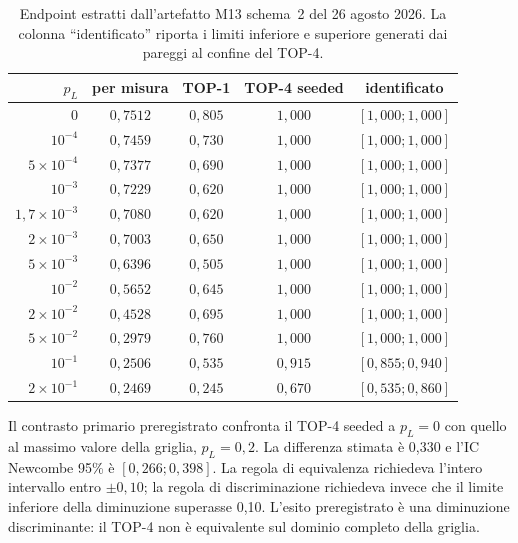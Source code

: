 \begin{onehalfspace}
\begin{table}[H]
\centering
\scriptsize
\begin{tabular}{rcccc}
\toprule
$p_L$ & per misura & TOP-1 & TOP-4 seeded & identificato \\
\midrule
$0$ & $0{,}7512$ & $0{,}805$ & $1{,}000$ & $[1{,}000;1{,}000]$ \\
$10^{-4}$ & $0{,}7459$ & $0{,}730$ & $1{,}000$ & $[1{,}000;1{,}000]$ \\
$5\times10^{-4}$ & $0{,}7377$ & $0{,}690$ & $1{,}000$ & $[1{,}000;1{,}000]$ \\
$10^{-3}$ & $0{,}7229$ & $0{,}620$ & $1{,}000$ & $[1{,}000;1{,}000]$ \\
$1{,}7\times10^{-3}$ & $0{,}7080$ & $0{,}620$ & $1{,}000$ & $[1{,}000;1{,}000]$ \\
$2\times10^{-3}$ & $0{,}7003$ & $0{,}650$ & $1{,}000$ & $[1{,}000;1{,}000]$ \\
$5\times10^{-3}$ & $0{,}6396$ & $0{,}505$ & $1{,}000$ & $[1{,}000;1{,}000]$ \\
$10^{-2}$ & $0{,}5652$ & $0{,}645$ & $1{,}000$ & $[1{,}000;1{,}000]$ \\
$2\times10^{-2}$ & $0{,}4528$ & $0{,}695$ & $1{,}000$ & $[1{,}000;1{,}000]$ \\
$5\times10^{-2}$ & $0{,}2979$ & $0{,}760$ & $1{,}000$ & $[1{,}000;1{,}000]$ \\
$10^{-1}$ & $0{,}2506$ & $0{,}535$ & $0{,}915$ & $[0{,}855;0{,}940]$ \\
$2\times10^{-1}$ & $0{,}2469$ & $0{,}245$ & $0{,}670$ & $[0{,}535;0{,}860]$ \\
\bottomrule
\end{tabular}
\caption[Endpoint preregistrati di M13]{Endpoint estratti dall'artefatto M13 schema~2 del 26 agosto 2026. La colonna ``identificato'' riporta i limiti inferiore e superiore generati dai pareggi al confine del TOP-4.}
\label{tab:app_comp_topk}
\end{table}

Il contrasto primario preregistrato confronta il TOP-4 seeded a $p_L=0$ con quello al massimo valore della griglia, $p_L=0,2$. La differenza stimata \`e 0,330 e l'IC Newcombe 95\% \`e $[0,266;0,398]$. La regola di equivalenza richiedeva l'intero intervallo entro $\pm0,10$; la regola di discriminazione richiedeva invece che il limite inferiore della diminuzione superasse 0,10. L'esito preregistrato \`e una diminuzione discriminante: il TOP-4 non \`e equivalente sul dominio completo della griglia.


\end{onehalfspace}
